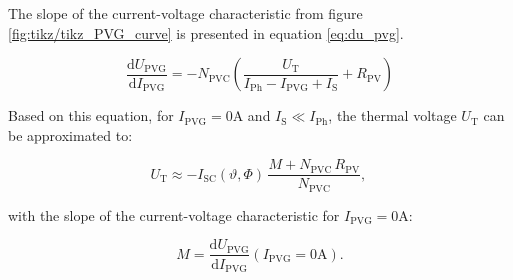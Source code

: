 The slope of the current-voltage characteristic from figure \ref{fig:tikz/tikz_PVG_curve} is presented in equation \ref{eq:du_pvg}.
\begin{center}
	\begin{equation} \label{eq:du_pvg}
		 \frac{\mathrm{d} U_{\mathrm{PVG}}}{\mathrm{d} I_{\mathrm{PVG}}} = - N_{\mathrm{PVC}} \left( \frac{U_{\mathrm{T}}}{I_{\mathrm{Ph}} - I_{\mathrm{PVG}} + I_{\mathrm{S}}}+ R_{\mathrm{PV}} \right)
	\end{equation}
\end{center}
Based on this equation, for $I_{\mathrm{PVG}} = 0\mathrm{A}$ and $I_{\mathrm{S}} \ll I_{\mathrm{Ph}}$, the thermal voltage $U_{\mathrm{T}}$ can be approximated to:
\begin{center}
	\begin{equation} \label{eq:u_thermal}
		 U_{\mathrm{T}} \approx - I_{\mathrm{SC}}\left(\vartheta,\Phi\right) \, \frac{M + N_{\mathrm{PVC}} \, R_{\mathrm{PV}}}{N_{\mathrm{PVC}}} \text{, }
	\end{equation}
\end{center}
with the slope of the current-voltage characteristic for $I_{\mathrm{PVG}} = 0\mathrm{A}$:
\begin{center}
	\begin{equation} \label{eq:du_pvg_M}
		 M = \frac{\mathrm{d} U_{\mathrm{PVG}}}{\mathrm{d} I_{\mathrm{PVG}}} \left( I_{\mathrm{PVG}} = 0\mathrm{A} \right) \text{.}
	\end{equation}
\end{center}

